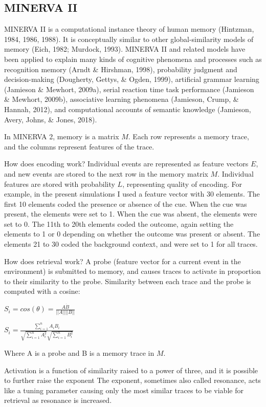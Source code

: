 \documentclass[
  english,
  man,floatsintext]{apa6}
\begin{document}
\hypertarget{minerva-ii}{%
\subsection{MINERVA II}\label{minerva-ii}}

MINERVA II is a computational instance theory of human memory (Hintzman, 1984, 1986, 1988). It is conceptually similar to other global-similarity models of memory (Eich, 1982; Murdock, 1993). MINERVA II and related models have been applied to explain many kinds of cognitive phenomena and processes such as recognition memory (Arndt \& Hirshman, 1998), probability judgment and decision-making (Dougherty, Gettys, \& Ogden, 1999), artificial grammar learning (Jamieson \& Mewhort, 2009a), serial reaction time task performance (Jamieson \& Mewhort, 2009b), associative learning phenomena (Jamieson, Crump, \& Hannah, 2012), and computational accounts of semantic knowledge (Jamieson, Avery, Johns, \& Jones, 2018).

In MINERVA 2, memory is a matrix \(M\). Each row represents a memory trace, and the columns represent features of the trace.

How does encoding work? Individual events are represented as feature vectors \(E\), and new events are stored to the next row in the memory matrix \(M\). Individual features are stored with probability \(L\), representing quality of encoding. For example, in the present simulations I used a feature vector with 30 elements. The first 10 elements coded the presence or absence of the cue. When the cue was present, the elements were set to 1. When the cue was absent, the elements were set to 0. The 11th to 20th elements coded the outcome, again setting the elements to 1 or 0 depending on whether the outcome was present or absent. The elements 21 to 30 coded the background context, and were set to 1 for all traces.

How does retrieval work? A probe (feature vector for a current event in the environment) is submitted to memory, and causes traces to activate in proportion to their similarity to the probe. Similarity between each trace and the probe is computed with a cosine:

\(S_i = cos(\theta) = \frac{A \dot B}{||A|| ||B||}\)

\(S_i = \frac{\sum_{i=1}^n A_iB_i}{\sqrt{\sum_{i=1}^n A_i^2}\sqrt{\sum_{i=1}^n B_i^2}}\)

Where A is a probe and B is a memory trace in \(M\).

Activation is a function of similarity raised to a power of three, and it is possible to further raise the exponent The exponent, sometimes also called resonance, acts like a tuning parameter causing only the most similar traces to be viable for retrieval as resonance is increased.
\end{document}
